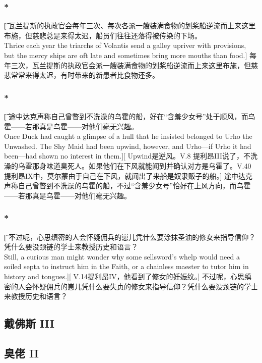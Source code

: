 \documentclass[12pt,a4paper]{article}
\begin{document}
\subsubsection{\color{red}*}\t[	
	瓦兰提斯的执政官会每年三次、每次各派一艘装满食物的划桨船逆流而上来这里布施，但慈悲总是来得太迟，船员们往往还落得被传染的下场。\\
	Thrice each year the triarchs of Volantis send a galley upriver with provisions, but the mercy ships are oft late and sometimes bring more mouths than food.]
	每年三次，瓦兰提斯的执政官会派一艘装满食物的划桨船逆流而上来这里布施，但慈悲常常来得太迟，有时带来的新患者比食物还多。
	
\subsubsection{\color{red}*}\t[
	途中达克声称自己曾瞥到不洗澡的乌霍的船，好在“含羞少女号”处于顺风，而乌霍——若那真是乌霍——对他们毫无兴趣。\\
	Once Duck had caught a glimpse of a hull that he insisted belonged to Urho the Unwashed. The Shy Maid had been upwind, however, and Urho—if Urho it had been—had shown no interest in them.][
	Upwind是逆风。V.8 提利昂III说了，不洗澡的乌霍那身味道臭死人。如果他们在下风就能闻到并确认对方是乌霍了。V.40 提利昂IX中，莫尔蒙由于自己在下风，就闻出了来船是奴隶贩子的船。]
	途中达克声称自己曾瞥到不洗澡的乌霍的船，不过“含羞少女号”恰好在上风方向，而乌霍——若那真是乌霍——对他们毫无兴趣。
	
\subsubsection{\color{red}*}\t[
	不过呢，心思缜密的人会怀疑佣兵的崽儿凭什么要涂抹圣油的修女来指导信仰？凭什么要没颈链的学士来教授历史和语言？\\
	Still, a curious man might wonder why some sellsword's whelp would need a soiled septa to instruct him in the Faith, or a chainless maester to tutor him in history and tongues.][
	V.14提利昂IV，他看到了修女的妊娠纹。]
	不过呢，心思缜密的人会怀疑佣兵的崽儿凭什么要失贞的修女来指导信仰？凭什么要没颈链的学士来教授历史和语言？
	
\subsection{戴佛斯 III}

\subsection{臭佬 II}
\end{document}
